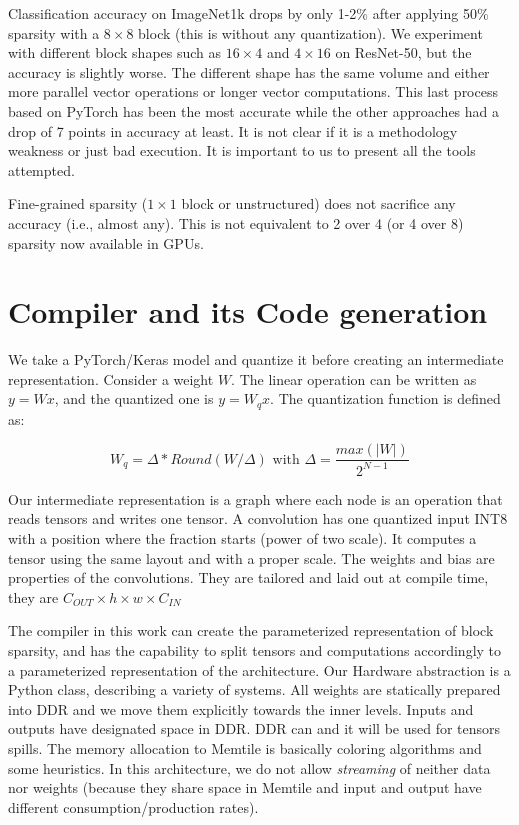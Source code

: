 \documentclass[conference]{IEEEtran}
\begin{document}
Classification accuracy on ImageNet1k drops by only 1-2\% after
applying 50\% sparsity with a $8\times 8$ block (this is without any
quantization). We experiment with different block shapes such as
$16\times 4$ and $4\times 16$ on ResNet-50, but the accuracy is
slightly worse. The different shape has the same volume and either
more parallel vector operations or longer vector computations.  This
last process based on PyTorch has been the most accurate while the
other approaches had a drop of 7 points in accuracy at least. It is
not clear if it is a methodology weakness or just bad execution. It is
important to us to present all the tools attempted.

Fine-grained sparsity ($1\times 1$ block or unstructured) does not
sacrifice any accuracy (i.e., almost any). This is not equivalent to 2
over 4 (or 4 over 8) sparsity now available in GPUs.




\section{Compiler and its Code generation}
\label{sec:compilers}
We take a PyTorch/Keras model and quantize it before creating an intermediate representation.
Consider a weight $W$. The linear operation can be written as $y=Wx$, and the quantized one is $y=W_{q}x$. The quantization function is defined as:

\begin{equation}
\label{eq:quant}
  W_{q} = \Delta * Round(W/\Delta) \mbox{ with }  \Delta = \frac{max(|W|)}{2^{N-1}}
\end{equation}


Our intermediate representation is a graph where each node is an
operation that reads tensors and writes one tensor.  A convolution has
one quantized input INT8 with a position where the fraction starts
(power of two scale). It computes a tensor using the same layout and
with a proper scale.  The weights and bias are properties of the
convolutions. They are tailored and laid out at compile time, they are
$C_{OUT}\times h \times w \times C_{IN}$

The compiler in this work can create the parameterized representation
of block sparsity, and has the capability to split tensors and
computations accordingly to a parameterized representation of the
architecture. Our Hardware abstraction is a Python class, describing a
variety of systems. All weights are statically prepared into DDR and
we move them explicitly towards the inner levels. Inputs and outputs
have designated space in DDR. DDR can and it will be used for tensors
spills.  The memory allocation to Memtile is basically coloring
algorithms and some heuristics. In this architecture, we do not allow
{\em streaming} of neither data nor weights (because they share space
in Memtile and input and output have different consumption/production
rates).
\end{document}
